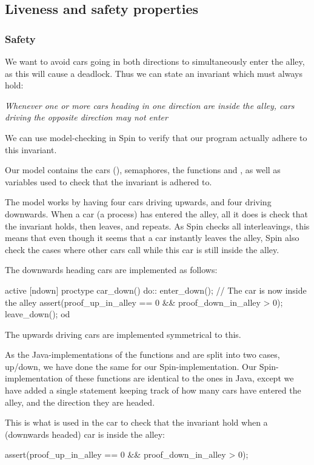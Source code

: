 \subsection{Liveness and safety properties}
\label{sub:all-proof}
\subsubsection{Safety}
We want to avoid cars going in both directions to simultaneously enter
the alley, as this will cause a deadlock. Thus we can state an
invariant which must always hold:

\emph{Whenever one or more cars heading in one direction are inside
  the alley, cars driving the opposite direction may not enter}

We can use model-checking in Spin to verify that our program actually
adhere to this invariant.

Our model contains the cars (), semaphores, the
functions  and , as well as variables used
to check that the invariant is adhered to.

The model works by having four cars driving upwards, and four driving
downwards. When a car (a process) has entered the alley, all it does
is check that the invariant holds, then leaves, and repeats. As Spin
checks all interleavings, this means that even though it seems that a
car instantly leaves the alley, Spin also check the cases where other
cars call  while this car is still inside the alley.

The downwards heading cars are implemented as follows:
\begin{promela}
active [ndown] proctype car_down(){
	do::
		enter_down();
		// The car is now inside the alley
		assert(proof_up_in_alley == 0 && proof_down_in_alley > 0);
		leave_down();
	od
}
\end{promela}

The upwards driving cars are implemented symmetrical to this.

As the Java-implementations of the functions  and
 are split into two cases, up/down, we have done the
same for our Spin-implementation. Our Spin-implementation of these
functions are identical to the ones in Java, except we have added a
single statement keeping track of how many cars have entered the
alley, and the direction they are headed.

This is what is used in the car  to check that the
invariant hold when a (downwards headed) car is inside the alley:
\begin{promela}
assert(proof_up_in_alley == 0 && proof_down_in_alley > 0);
\end{promela}

